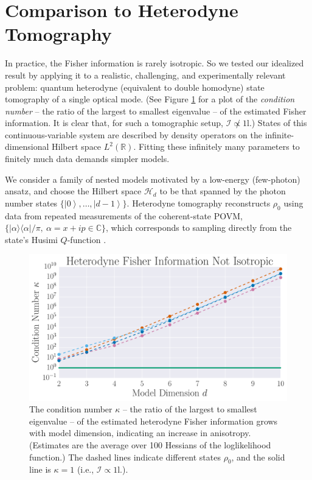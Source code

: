 \documentclass[aps,pra, twocolumn]{revtex4-1}
\newcommand{\reals}{\mathbb{R}}
\newcommand{\Id}{\mathbb{I}}
\newcommand{\ket}[1]{\ensuremath{\left|#1\right\rangle}}
\def\Id{1\!\mathrm{l}}
\begin{document}
\section{Comparison to Heterodyne Tomography}
In practice, the Fisher information is rarely isotropic.  So we tested our idealized result by applying it to a realistic, challenging, and experimentally relevant problem: quantum heterodyne (equivalent to double homodyne) state tomography \cite{Lvovsky2001a, Bertrand1987, Leonhardt1995, Lvovsky2009} of a single optical mode.  (See Figure \ref{fig:fish_condition} for a plot of the \emph{condition number} -- the ratio of the largest to smallest eigenvalue -- of the estimated Fisher information. It is clear that, for such a tomographic setup, $\mathcal{I} \not \propto \Id$.) States of this continuous-variable system are described by density operators on the infinite-dimensional Hilbert space $L^2(\reals)$.  Fitting these infinitely many parameters to finitely much data demands simpler models.

We consider a family of nested models motivated by a low-energy (few-photon) ansatz, and choose   
the Hilbert space $\mathcal{H}_d$ to be that spanned by the photon number states $\{\ket{0},\ldots ,\ket{d-1}\}$.
Heterodyne tomography reconstructs $\rho_{0}$ using data from repeated measurements of the 
coherent-state POVM, $\{|\alpha\rangle\langle \alpha| /\pi, ~\alpha=x+ip\in \mathbb{C}\}$, which corresponds to sampling directly from the 
state's Husimi $Q$-function \cite{Husimi1940}.

\begin{figure}[h]
  \includegraphics[width=\columnwidth]{Images/Figure_6.pdf}
 \caption{The condition number $\kappa$ -- the ratio of the largest to smallest eigenvalue -- of the estimated heterodyne Fisher information grows with model dimension, indicating an increase in anisotropy. (Estimates are the average over 100 Hessians of the loglikelihood function.) The dashed lines indicate different states $\rho_{0}$, and the solid line is $\kappa = 1$ (i.e., $\mathcal{I} \propto \Id$.).}
\label{fig:fish_condition}
\end{figure}
\end{document}
